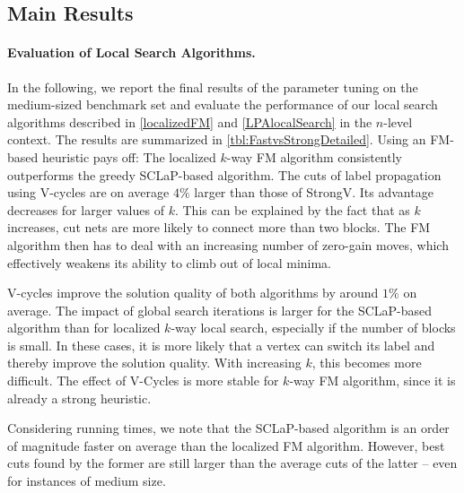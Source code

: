 \documentclass[runningheads,a4paper]{llncs}
\newcommand{\csch}[1]{{\color{blue}[CS: #1]}}
\renewcommand{\csch}[1]{}
\begin{document}
\subsection{Main Results}
\paragraph{Evaluation of Local Search Algorithms.}
In the following, we report the final results of the parameter tuning on the medium-sized benchmark set and 
evaluate the performance of our local search algorithms described in \autoref{localizedFM} and \autoref{LPAlocalSearch} in the $n$-level context.
The results are summarized in \autoref{tbl:FastvsStrongDetailed}. Using an FM-based heuristic pays off: 
The localized $k$-way FM algorithm consistently outperforms the greedy SCLaP-based algorithm. The cuts of label propagation using V-cycles
are on average $4\%$ larger than those of StrongV.
Its advantage decreases for larger values of $k$. This can be explained by the fact that as $k$ increases, cut nets are more likely to connect
more than two blocks. The FM algorithm then has to deal with an increasing number of zero-gain moves, which effectively weakens its
ability to climb out of local minima. \csch{mention somewhere that small improvments in the objective have a large value in practice with the right citation (perhaps in the intro)}

V-cycles improve the solution quality of both algorithms by around $1\%$ on average. The impact of global search iterations 
is larger for the SCLaP-based algorithm than for localized $k$-way local search, especially if the number of blocks is small.
In these cases, it is more likely that a vertex can switch its label and thereby improve the solution quality. With increasing $k$,
this becomes more difficult. The effect of V-Cycles is more stable for $k$-way FM algorithm, since it is already a strong heuristic.   

Considering running times, we note that the SCLaP-based algorithm is an order of magnitude faster on average than the localized FM algorithm.
However, best cuts found by the former are still larger than the average cuts of the latter -- even for instances of medium size.
\end{document}
